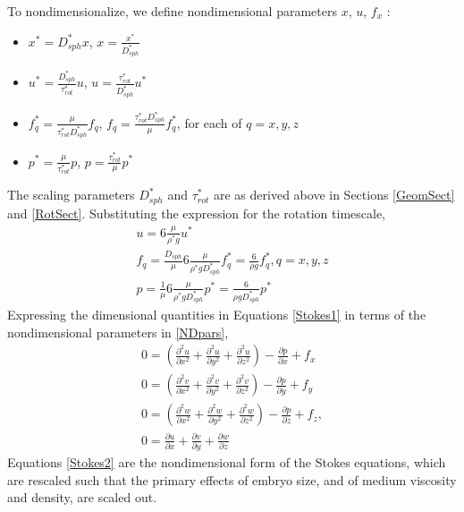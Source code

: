 \documentclass[10pt,a4paper]{article}
\def\non{\nonumber}
\def\p{\partial}
\begin{document}
To nondimensionalize, we define nondimensional parameters $x$, $u$, $f_x$ :
\begin{itemize}
	\item $x^* = D_{sph}^* x$, $x = \frac{x^*}{D_{sph}^*}$
	\item $u^* = \frac{D_{sph}^*}{\tau_{rot}^*} u$, $u = \frac{\tau_{rot}^*}{D_{sph}^*} u^*$
	\item $f_q^* = \frac{\mu}{\tau_{rot}^* D_{sph}^*} f_q$, $f_q = \frac{\tau_{rot}^* D_{sph}^*}{\mu} f_q^*$, for each of $q = x, y, z$
	\item $p^* = \frac{\mu}{\tau_{rot}^*} p$, $p = \frac{\tau_{rot}^*}{\mu} p^*$
\end{itemize}
The scaling parameters $D_{sph}^*$ and $\tau_{rot}^*$ are as derived above in Sections \ref{GeomSect} and \ref{RotSect}.
Substituting the expression for the rotation timescale,
\begin{eqnarray}\label{NDpars}
	u = 6 \frac{\mu}{\rho^* g } u^* \non \\
	f_q = \frac{D_{sph}}{\mu} 6 \frac{\mu}{\rho^* g D_{sph}^*} f_q^* = \frac{6}{\rho g} f_q^*, q = x, y, z \non \\
	p = \frac{1}{\mu} 6 \frac{\mu}{\rho^* g D_{sph}^*} p^* = \frac{6}{\rho g D_{sph}^*} p^*
\end{eqnarray}
Expressing the dimensional quantities in Equations \ref{Stokes1} in terms of the nondimensional parameters in \ref{NDpars}, 
\begin{eqnarray}\label{Stokes2}
	0 = \left( \frac{\p^2 u}{\p x^2}+\frac{\p^2 u}{\p y^2}+\frac{\p^2 u}{\p z^2} \right) - \frac{\p p}{\p x} + f_x \non \\
	0 = \left( \frac{\p^2 v}{\p x^2}+\frac{\p^2 v}{\p y^2}+\frac{\p^2 v}{\p z^2} \right) - \frac{\p p}{\p y} + f_y \non \\
	0 = \left( \frac{\p^2 w}{\p x^2}+\frac{\p^2 w}{\p y^2}+\frac{\p^2 w}{\p z^2} \right) - \frac{\p p}{\p z} + f_z , \non \\
	0 =  \frac{\p u}{\p {x}}+\frac{\p v}{\p {y}}+\frac{\p w}{\p {z}}
\end{eqnarray}
Equations \ref{Stokes2} are the nondimensional form of the Stokes equations, which are rescaled such that the primary effects of embryo size, and of medium viscosity and density, are scaled out.  
\end{document}

